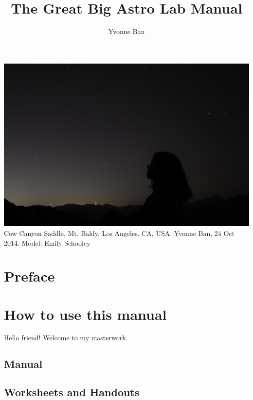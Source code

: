 \documentclass[12pt]{article}
\title{The Great Big Astro Lab Manual}
\author{Yvonne Ban}
\begin{document}
\begin{titlepage}

\maketitle
\begin{center}
\includegraphics[width=\textwidth]{IMG_0499.JPG}
Cow Canyon Saddle, Mt. Baldy, Los Angeles, CA, USA. Yvonne Ban, 24 Oct 2014. Model: Emily Schooley
\end{center}

\thispagestyle{empty}
\clearpage
{}

\end{titlepage}

\tableofcontents

\section*{Preface}


\section{How to use this manual}

Hello friend! Welcome to my masterwork.


\subsection{Manual}


\subsection{Worksheets and Handouts}
\end{document}
